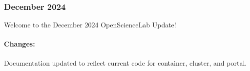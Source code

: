 \subsubsection{December 2024}

Welcome to the December 2024 OpenScienceLab Update!

\paragraph{Changes:}

Documentation updated to reflect current code for container, cluster, and portal.